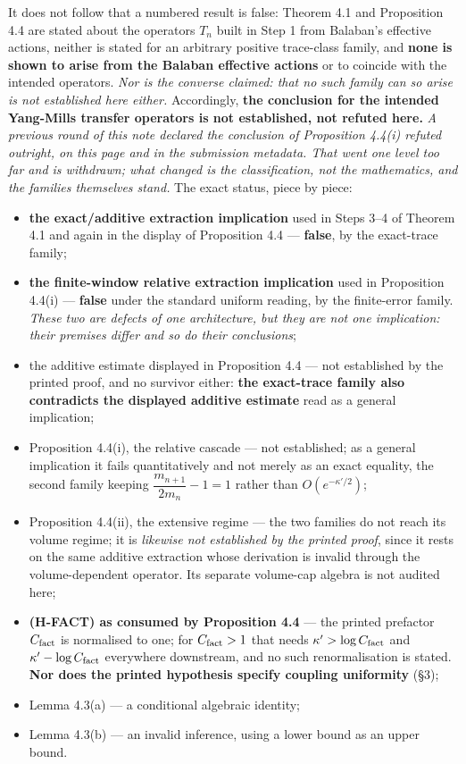\documentclass[11pt]{article}
\begin{document}
It does not follow that a numbered result is false: Theorem 4.1 and Proposition 4.4
are stated about the operators $T_n$ built in Step 1 from Balaban's effective actions,
neither is stated for an arbitrary positive trace-class family, and \textbf{none is
shown to arise from the Balaban effective actions} or to coincide with the intended
operators. \emph{Nor is the converse claimed: that no such family can so arise is not
established here either.} Accordingly, \textbf{the conclusion for the intended
Yang\nobreakdash-Mills transfer operators is not established, not refuted here.} \emph{A previous round of this note
declared the conclusion of Proposition 4.4(i) refuted outright, on this page and in
the submission metadata. That went one level too far and is withdrawn; what changed is
the classification, not the mathematics, and the families themselves stand.} The exact
status, piece by piece:
\begin{itemize}\setlength{\itemsep}{0pt}
\item \textbf{the exact/additive extraction implication} used in Steps 3--4 of
Theorem 4.1 and again in the display of Proposition 4.4 --- \textbf{false}, by the
exact-trace family;
\item \textbf{the \mbox{finite-window} relative extraction implication} used in Proposition
4.4(i) --- \textbf{false} under the standard uniform reading, by the finite-error
family. \emph{These two are defects of one architecture, but they are not one
implication: their premises differ and so do their conclusions};
\item the additive estimate displayed in Proposition 4.4 --- not established by the
printed proof, and no survivor either: \textbf{the exact-trace family also contradicts
the displayed additive estimate} read as a general implication;
\item Proposition 4.4(i), the relative cascade --- not established; as a general
implication it fails quantitatively and not merely as an exact equality, the second
family keeping $\dfrac{m_{n+1}}{2m_n}-1=1$ rather than $O(e^{-\kappa'/2})$;
\item Proposition 4.4(ii), the extensive regime --- the two families do not reach its
volume regime; it is \emph{likewise not established by the printed proof}, since it
rests on the same additive extraction whose derivation is invalid through the
volume-dependent operator. Its separate volume-cap algebra is not audited here;
\item \textbf{(H-FACT) as consumed by Proposition 4.4} --- the printed prefactor
$C_{\rm fact}$ is normalised to one; for $C_{\rm fact}>1$ that needs
$\kappa'>\log C_{\rm fact}$ and $\kappa'-\log C_{\rm fact}$ everywhere downstream, and
no such renormalisation is stated. \textbf{Nor does the printed hypothesis specify
coupling uniformity} (\S3);
\item Lemma 4.3(a) --- a conditional algebraic identity;
\item Lemma 4.3(b) --- an invalid inference, using a lower bound as an upper bound.
\end{itemize}
\end{document}
